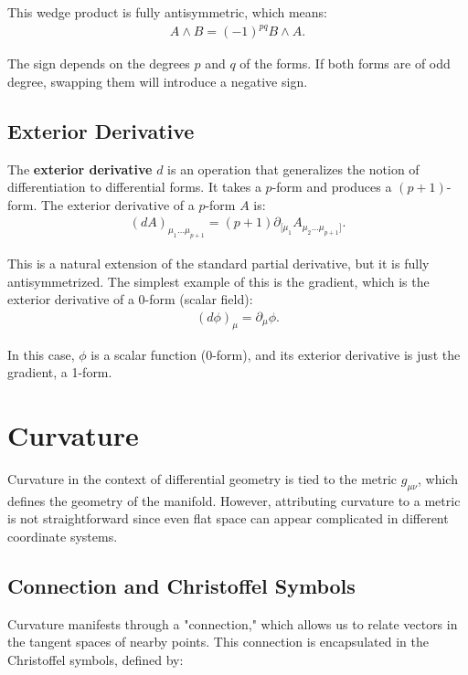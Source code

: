 \documentclass[11pt,letterpaper]{book}
\begin{document}
This wedge product is fully antisymmetric, which means:
\begin{align}
A \wedge B = (-1)^{pq} B \wedge A.
\end{align}


The sign depends on the degrees \( p \) and \( q \) of the forms. If both forms are of odd degree, swapping them will introduce a negative sign.

\subsection{Exterior Derivative}

The \textbf{exterior derivative} \( d \) is an operation that generalizes the notion of differentiation to differential forms. It takes a \( p \)-form and produces a \( (p+1) \)-form. The exterior derivative of a \( p \)-form \( A \) is:
\begin{align}
(dA)_{\mu_1 \dots \mu_{p+1}} = (p+1) \partial_{[\mu_1} A_{\mu_2 \dots \mu_{p+1}]}.
\end{align}

This is a natural extension of the standard partial derivative, but it is fully antisymmetrized. The simplest example of this is the gradient, which is the exterior derivative of a 0-form (scalar field):
\begin{align}
(d\phi)_\mu = \partial_\mu \phi.
\end{align}

In this case, \( \phi \) is a scalar function (0-form), and its exterior derivative is just the gradient, a 1-form.





\section{Curvature}
Curvature in the context of differential geometry is tied to the metric \(g_{\mu\nu}\), which defines the geometry of the manifold. However, attributing curvature to a metric is not straightforward since even flat space can appear complicated in different coordinate systems.

\subsection{Connection and Christoffel Symbols}
Curvature manifests through a "connection," which allows us to relate vectors in the tangent spaces of nearby points. This connection is encapsulated in the Christoffel symbols, defined by:
\end{document}
